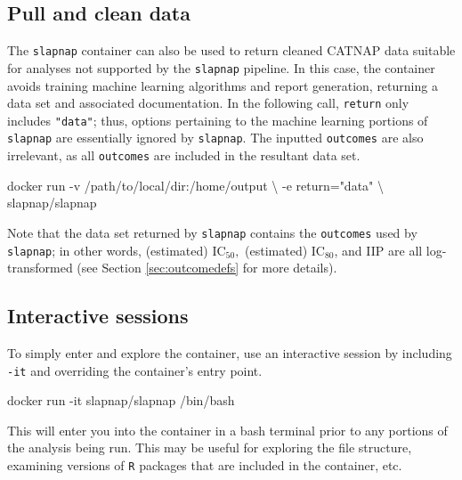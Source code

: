 \documentclass[
]{article}
\newenvironment{Shaded}{\begin{snugshade}}{\end{snugshade}}
\newcommand{\ExtensionTok}[1]{#1}
\newcommand{\NormalTok}[1]{#1}
\newcommand{\StringTok}[1]{\textcolor[rgb]{0.31,0.60,0.02}{#1}}
\begin{document}
\hypertarget{pull-and-clean-data}{%
\subsection{Pull and clean data}\label{pull-and-clean-data}}

The \texttt{slapnap} container can also be used to return cleaned CATNAP data suitable for analyses not supported by the \texttt{slapnap} pipeline. In this case, the container avoids training machine learning algorithms and report generation, returning a data set and associated documentation. In the following call, \texttt{return} only includes \texttt{"data"}; thus, options pertaining to the machine learning portions of \texttt{slapnap} are essentially ignored by \texttt{slapnap}. The inputted \texttt{outcomes} are also irrelevant, as all \texttt{outcomes} are included in the resultant data set.

\begin{Shaded}
\begin{Highlighting}[]
\ExtensionTok{docker}\NormalTok{ run {-}v /path/to/local/dir:/home/output \textbackslash{}}
\NormalTok{           {-}e return=}\StringTok{"data"}\NormalTok{ \textbackslash{}}
\NormalTok{           slapnap/slapnap}
\end{Highlighting}
\end{Shaded}

Note that the data set returned by \texttt{slapnap} contains the \texttt{outcomes} used by \texttt{slapnap}; in other words, (estimated) IC\(_{50},\) (estimated) IC\(_{80}\), and IIP are all log-transformed (see Section \ref{sec:outcomedefs} for more details).

\hypertarget{interactive-sessions}{%
\subsection{Interactive sessions}\label{interactive-sessions}}

To simply enter and explore the container, use an interactive session by including \texttt{-it} and overriding the container's entry point.

\begin{Shaded}
\begin{Highlighting}[]
\ExtensionTok{docker}\NormalTok{ run {-}it slapnap/slapnap /bin/bash}
\end{Highlighting}
\end{Shaded}

This will enter you into the container in a bash terminal prior to any portions of the analysis being run. This may be useful for exploring the file structure, examining versions of \texttt{R} packages that are included in the container, etc.
\end{document}
